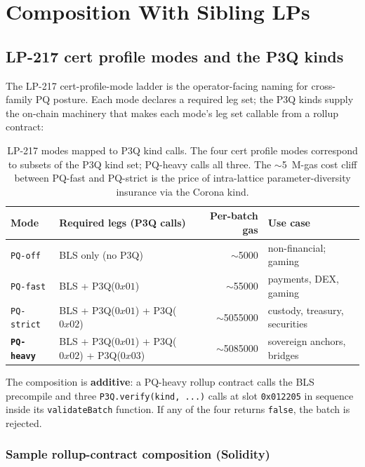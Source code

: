 \section{Composition With Sibling LPs}
\label{sec:composition}

\subsection{LP-217 cert profile modes and the P3Q kinds}

The LP-217 cert-profile-mode ladder is the operator-facing
naming for cross-family PQ posture. Each mode declares a
required leg set; the P3Q kinds supply the on-chain machinery
that makes each mode's leg set callable from a rollup contract:

\begin{table}[h]
\centering
\small
\begin{tabular}{@{}lp{4.5cm}rl@{}}
\toprule
\textbf{Mode} & \textbf{Required legs (P3Q calls)} & \textbf{Per-batch gas} & \textbf{Use case} \\
\midrule
\texttt{PQ-off} & BLS only (no P3Q) & $\sim$\SI{5000}{} & non-financial; gaming \\
\texttt{PQ-fast} & BLS + P3Q($0x01$) & $\sim$\SI{55000}{} & payments, DEX, gaming \\
\texttt{PQ-strict} & BLS + P3Q($0x01$) + P3Q($0x02$) & $\sim$\SI{5055000}{} & custody, treasury, securities \\
\textbf{\texttt{PQ-heavy}} & BLS + P3Q($0x01$) + P3Q($0x02$) + P3Q($0x03$) & $\sim$\SI{5085000}{} & sovereign anchors, bridges \\
\bottomrule
\end{tabular}
\caption{LP-217 modes mapped to P3Q kind calls. The four cert
profile modes correspond to subsets of the P3Q kind set; PQ-heavy
calls all three. The $\sim$\SI{5}{M}-gas cost cliff between
PQ-fast and PQ-strict is the price of intra-lattice parameter-diversity
insurance via the Corona kind.}
\label{tab:cert-modes-p3q}
\end{table}

The composition is \textbf{additive}: a PQ-heavy rollup contract
calls the BLS precompile and three \texttt{P3Q.verify(kind, ...)}
calls at slot \texttt{0x012205} in sequence inside its
\texttt{validateBatch} function. If any of the four returns
\texttt{false}, the batch is rejected.

\subsubsection{Sample rollup-contract composition (Solidity)}

